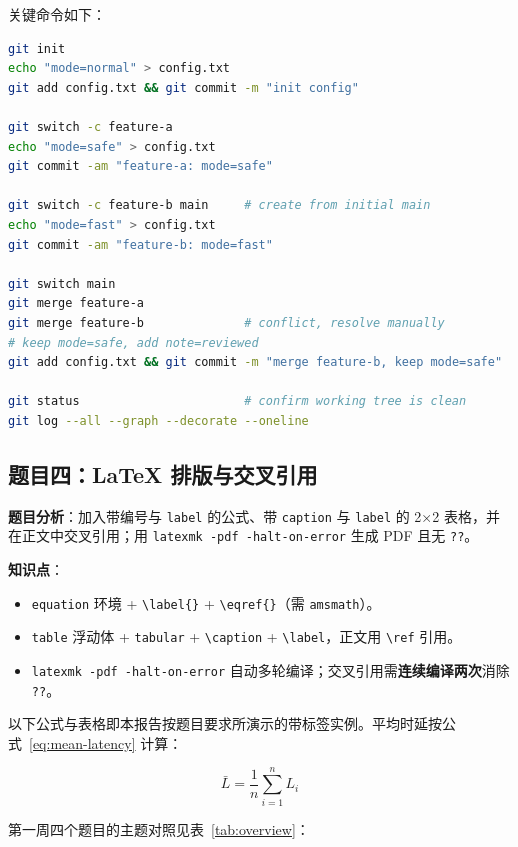 \documentclass[a4paper, 12pt]{article}
\begin{document}
关键命令如下：

\begin{lstlisting}[language=bash]
git init
echo "mode=normal" > config.txt
git add config.txt && git commit -m "init config"

git switch -c feature-a
echo "mode=safe" > config.txt
git commit -am "feature-a: mode=safe"

git switch -c feature-b main     # create from initial main
echo "mode=fast" > config.txt
git commit -am "feature-b: mode=fast"

git switch main
git merge feature-a
git merge feature-b              # conflict, resolve manually
# keep mode=safe, add note=reviewed
git add config.txt && git commit -m "merge feature-b, keep mode=safe"

git status                       # confirm working tree is clean
git log --all --graph --decorate --oneline
\end{lstlisting}

\subsection{题目四：\LaTeX{} 排版与交叉引用}

\textbf{题目分析}：加入带编号与 \texttt{label} 的公式、带 \texttt{caption} 与 \texttt{label} 的 2×2 表格，并在正文中交叉引用；用 \texttt{latexmk -pdf -halt-on-error} 生成 PDF 且无 \texttt{??}。

\textbf{知识点}：
\begin{itemize}
  \item \texttt{equation} 环境 + \texttt{\textbackslash label\{\}} + \texttt{\textbackslash eqref\{\}}（需 \texttt{amsmath}）。
  \item \texttt{table} 浮动体 + \texttt{tabular} + \texttt{\textbackslash caption} + \texttt{\textbackslash label}，正文用 \texttt{\textbackslash ref} 引用。
  \item \texttt{latexmk -pdf -halt-on-error} 自动多轮编译；交叉引用需\textbf{连续编译两次}消除 \texttt{??}。
\end{itemize}

以下公式与表格即本报告按题目要求所演示的带标签实例。平均时延按公式~\eqref{eq:mean-latency} 计算：

\begin{equation}
  \bar{L} = \frac{1}{n} \sum_{i=1}^{n} L_i
  \label{eq:mean-latency}
\end{equation}

第一周四个题目的主题对照见表~\ref{tab:overview}：
\end{document}
